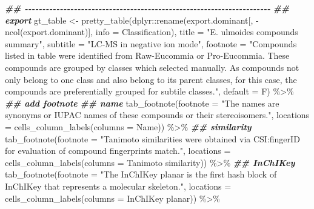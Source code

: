 \documentclass[
]{article}
\newenvironment{Shaded}{\begin{snugshade}}{\end{snugshade}}
\newcommand{\AttributeTok}[1]{\textcolor[rgb]{0.77,0.63,0.00}{#1}}
\newcommand{\DocumentationTok}[1]{\textcolor[rgb]{0.56,0.35,0.01}{\textbf{\textit{#1}}}}
\newcommand{\FunctionTok}[1]{\textcolor[rgb]{0.00,0.00,0.00}{#1}}
\newcommand{\NormalTok}[1]{#1}
\newcommand{\OtherTok}[1]{\textcolor[rgb]{0.56,0.35,0.01}{#1}}
\newcommand{\SpecialCharTok}[1]{\textcolor[rgb]{0.00,0.00,0.00}{#1}}
\newcommand{\StringTok}[1]{\textcolor[rgb]{0.31,0.60,0.02}{#1}}
\begin{document}
\begin{Shaded}
\begin{Highlighting}[]
\DocumentationTok{\#\# {-}{-}{-}{-}{-}{-}{-}{-}{-}{-}{-}{-}{-}{-}{-}{-}{-}{-}{-}{-}{-}{-}{-}{-}{-}{-}{-}{-}{-}{-}{-}{-}{-}{-}{-}{-}{-}{-}{-}{-}{-}{-}{-}{-}{-}{-}{-}{-}{-}{-}{-}{-}{-}{-}{-}{-}{-}{-}{-}{-}{-}{-}{-}{-}{-}{-}{-}{-}{-}{-} }
\DocumentationTok{\#\# export}
\NormalTok{gt\_table }\OtherTok{\textless{}{-}} \FunctionTok{pretty\_table}\NormalTok{(dplyr}\SpecialCharTok{::}\FunctionTok{rename}\NormalTok{(export.dominant[, }\SpecialCharTok{{-}}\FunctionTok{ncol}\NormalTok{(export.dominant)], }\AttributeTok{info =}\NormalTok{ Classification),}
  \AttributeTok{title =} \StringTok{"E. ulmoides compounds summary"}\NormalTok{,}
  \AttributeTok{subtitle =} \StringTok{"LC{-}MS in negative ion mode"}\NormalTok{,}
  \AttributeTok{footnote =} \StringTok{"Compounds listed in table were identified from Raw{-}Eucommia or Pro{-}Eucommia. These compounds are grouped by classes which selected manually. As compounds not only belong to one class and also belong to its parent classes, for this case, the compounds are preferentially grouped for subtile classes."}\NormalTok{,}
  \AttributeTok{default =}\NormalTok{ F) }\SpecialCharTok{\%\textgreater{}\%} 
\DocumentationTok{\#\# add footnote}
\DocumentationTok{\#\# name}
\FunctionTok{tab\_footnote}\NormalTok{(}\AttributeTok{footnote =} \StringTok{"The names are synonyms or IUPAC names of these compounds or their stereoisomers."}\NormalTok{,}
  \AttributeTok{locations =} \FunctionTok{cells\_column\_labels}\NormalTok{(}\AttributeTok{columns =}\NormalTok{ Name)) }\SpecialCharTok{\%\textgreater{}\%} 
\DocumentationTok{\#\# similarity}
\FunctionTok{tab\_footnote}\NormalTok{(}\AttributeTok{footnote =} \StringTok{"Tanimoto similarities were obtained via CSI:fingerID for evaluation of compound fingerprints match."}\NormalTok{,}
  \AttributeTok{locations =} \FunctionTok{cells\_column\_labels}\NormalTok{(}\AttributeTok{columns =} \StringTok{\textasciigrave{}}\AttributeTok{Tanimoto similarity}\StringTok{\textasciigrave{}}\NormalTok{)) }\SpecialCharTok{\%\textgreater{}\%} 
\DocumentationTok{\#\# InChIKey}
\FunctionTok{tab\_footnote}\NormalTok{(}\AttributeTok{footnote =} \StringTok{"The \textquotesingle{}InChIKey planar\textquotesingle{} is the first hash block of InChIKey that represents a molecular skeleton."}\NormalTok{,}
  \AttributeTok{locations =} \FunctionTok{cells\_column\_labels}\NormalTok{(}\AttributeTok{columns =} \StringTok{\textasciigrave{}}\AttributeTok{InChIKey planar}\StringTok{\textasciigrave{}}\NormalTok{)) }\SpecialCharTok{\%\textgreater{}\%} 

\end{Highlighting}
\end{Shaded}
\end{document}
